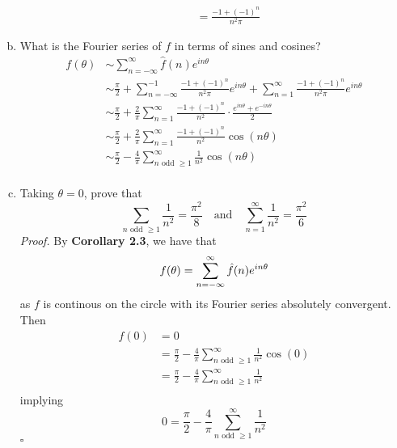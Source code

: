 \documentclass[12pt]{article}
\newenvironment{proof}{\textit{Proof.}}{\hfill$\square$}
\begin{document}
\begin{enumerate}[(a)]
\begin{enumerate}[(i)]
\begin{align*}
            &=\frac{-1+(-1)^n}{n^2\pi} 
        \end{align*}
    \end{enumerate}
    \item What is the Fourier series of $f$ in terms of sines and cosines?
    \begin{align*}
        f(\theta)&\sim\sum_{n=-\infty}^{\infty}\hat{f}(n)e^{in\theta} \\
        &\sim\frac{\pi}{2} + \sum_{n=-\infty}^{-1}\frac{-1 + (-1)^n}{n^2\pi}e^{in\theta} + \sum_{n=1}^{\infty}\frac{-1 + (-1)^n}{n^2\pi}e^{in\theta} \\
        &\sim\frac{\pi}{2} + \frac{2}{\pi}\sum_{n=1}^{\infty}\frac{-1 + (-1)^n}{n^2}\cdot\frac{e^{in\theta} + e^{-in\theta}}{2} \\
        &\sim\frac{\pi}{2} + \frac{2}{\pi}\sum_{n=1}^{\infty}\frac{-1 + (-1)^n}{n^2}\cos(n\theta) \\
        &\sim\frac{\pi}{2} - \frac{4}{\pi}\sum_{n\text{ odd }\ge1}^{\infty}\frac{1}{n^2}\cos(n\theta) \\
    \end{align*}
    \item Taking $\theta=0$, prove that
    \begin{equation*}
        \sum_{n\text{ odd }\ge1}\frac{1}{n^2}=\frac{\pi^2}{8}\hspace{1em}\text{and}\hspace{1em}\sum_{n=1}^{\infty}\frac{1}{n^2}=\frac{\pi^2}{6}
    \end{equation*}
    \newpage
    \begin{proof}
        By \textbf{Corollary 2.3}, we have that
        \begin{equation*}
            f(\theta) = \sum_{n=-\infty}^{\infty}\hat{f}(n)e^{in\theta} \\
        \end{equation*}
        as $f$ is continous on the circle with its Fourier series absolutely convergent. Then
        \begin{align*}
            f(0)&=0\\
            &=\frac{\pi}{2} - \frac{4}{\pi}\sum_{n\text{ odd }\ge1}^{\infty}\frac{1}{n^2}\cos(0) \\
            &=\frac{\pi}{2} - \frac{4}{\pi}\sum_{n\text{ odd }\ge1}^{\infty}\frac{1}{n^2} \\
        \end{align*}
        implying
        \begin{equation}
            0=\frac{\pi}{2} - \frac{4}{\pi}\sum_{n\text{ odd }\ge1}^{\infty}\frac{1}{n^2}

\end{equation}
\end{proof}
\end{enumerate}
\end{document}
